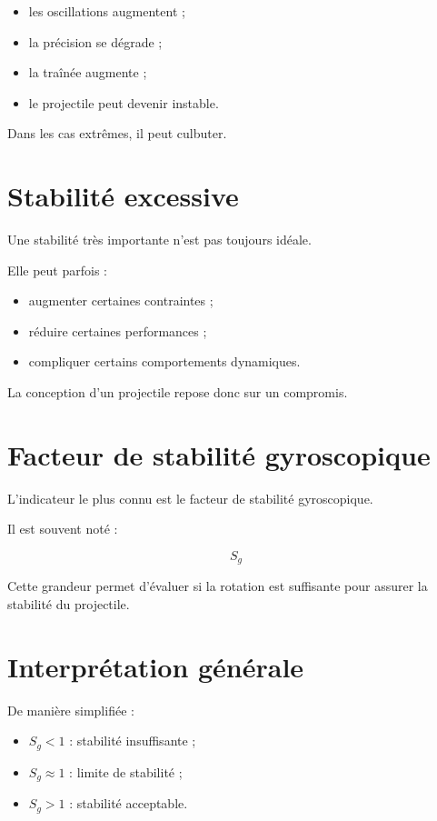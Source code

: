\begin{itemize}
    \item les oscillations augmentent ;
    \item la précision se dégrade ;
    \item la traînée augmente ;
    \item le projectile peut devenir instable.
\end{itemize}

Dans les cas extrêmes, il peut culbuter.

\section{Stabilité excessive}

Une stabilité très importante n'est pas toujours idéale.

Elle peut parfois :

\begin{itemize}
    \item augmenter certaines contraintes ;
    \item réduire certaines performances ;
    \item compliquer certains comportements dynamiques.
\end{itemize}

La conception d'un projectile repose donc sur un compromis.

\section{Facteur de stabilité gyroscopique}

L'indicateur le plus connu est le facteur de stabilité gyroscopique.

Il est souvent noté :

\begin{equation}
S_g
\end{equation}

Cette grandeur permet d'évaluer si la rotation est suffisante pour assurer
la stabilité du projectile.

\section{Interprétation générale}

De manière simplifiée :

\begin{itemize}
    \item $S_g < 1$ : stabilité insuffisante ;
    \item $S_g \approx 1$ : limite de stabilité ;
    \item $S_g > 1$ : stabilité acceptable.
\end{itemize}

